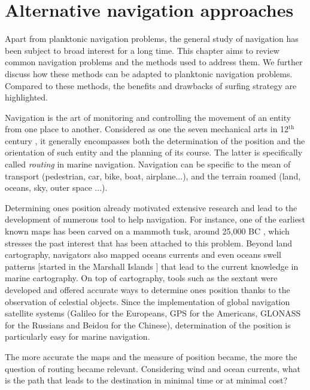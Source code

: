 \chapter{Alternative navigation approaches}\label{chap:navigation}

Apart from planktonic navigation problems, the general study of navigation has been subject to broad interest for a long time. 
This chapter aims to review common navigation problems and the methods used to address them.
We further discuss how these methods can be adapted to planktonic navigation problems.
Compared to these methods, the benefits and drawbacks of surfing strategy are highlighted.

Navigation is the art of monitoring and controlling the movement of an entity from one place to another.
Considered as one the seven mechanical arts in 12$^{\mathrm{th}}$ century \citep{taylor1961didascalicon, stahl1971martianus}, it generally encompasses both the determination of the position and the orientation of such entity and the planning of its course.
The latter is specifically called \textit{routing} in marine navigation.
Navigation can be specific to the mean of transport (pedestrian, car, bike, boat, airplane...), and the terrain roamed (land, oceans, sky, outer space ...).

Determining ones position already motivated extensive research and lead to the development of numerous tool to help navigation.
For instance, one of the earliest known maps has been carved on a mammoth tusk, around 25,000 BC \citep{wolodtschenko2007prehistoric}, which stresses the past interest that has been attached to this problem.
Beyond land cartography, navigators also mapped oceans currents and even oceans swell patterns [started in the Marshall Islands \citep{bagrow2017history}] that lead to the current knowledge in marine cartography.
On top of cartography, tools such as the sextant were developed and offered accurate ways to determine ones position thanks to the observation of celestial objects.
Since the implementation of global navigation satellite systems (Galileo for the Europeans, GPS for the Americans, GLONASS for the Russians and Beidou for the Chinese), determination of the position is particularly easy for marine navigation.

The more accurate the maps and the measure of position became, the more the question of routing became relevant.
Considering wind and ocean currents, what is the path that leads to the destination in minimal time or at minimal cost?


